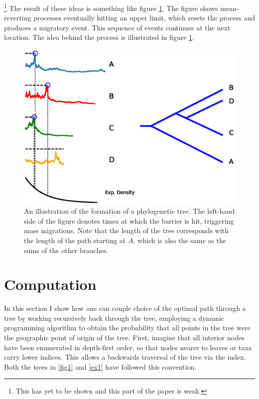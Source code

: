 \documentclass[11pt]{article}
\begin{document}
\footnote{This has yet to be shown and this part of the paper is weak.} The result of these ideas is something like figure \ref{evo1}. The figure shows mean-reverting processes eventually hitting an upper limit, which resets the process and produces a migratory event. This sequence of events continues at the next location. The idea behind the process is illustrated in figure \ref{evo1}.

\begin{figure}
\begin{center}
\includegraphics[width=\textwidth]{AncillaryFiles//figure3.eps}
\caption{An illustration of the formation of a phylogenetic tree. The left-hand side of the figure denotes times at which the barrier is hit, triggering mass migrations. Note that the length of the tree corresponds with the length of the path starting at $A$, which is also the same as the sums of the other branches.} \label{evo1}
\end{center} 
\end{figure}


\section{Computation}

In this section I  show how one can couple choice of the optimal path through a tree by working recursively back through the tree, employing a dynamic programming algorithm to obtain the probability that all points in the tree were the geographic point of origin of the tree. First, imagine that all interior nodes have been enumerated in depth-first order, so that nodes nearer to leaves or taxa carry lower indices. This allows a backwards traversal of the tree via the index. Both the trees in \ref{fig1} and \ref{ex1} have followed this convention. 
\end{document}
